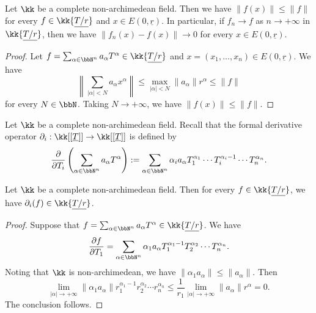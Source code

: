     \begin{lemma}\label{prop:convergence_of_restricted_power_series_imply_convergence_of_functions}
        Let \(\kk\) be a complete non-archimedean field.
        Then we have \(\|f(x)\| \leq \|f\|\) for every \(f \in \kk\{ \underline{T/r} \} \) and \(x \in E(0,\underline{r})\).
        In particular, if \(f_n \to f\) as \(n \to +\infty\) in \(\kk\{ \underline{T/r} \} \), then we have \(\|f_n(x) - f(x)\| \to 0\) for every \(x \in E(0,\underline{r})\).
    \end{lemma}
    \begin{proof}
        Let \(f = \sum_{\alpha \in \bbN^n} a_\alpha T^\alpha \in \kk\{ \underline{T/r} \} \) and \(x = (x_1, \ldots, x_n) \in E(0,\underline{r})\).
        We have
        \[ \left\| \sum_{|\alpha| < N} a_\alpha x^\alpha \right\| \leq \max_{|\alpha| < N} \|a_\alpha\| r^\alpha \leq \|f\| \]
        for every \(N \in \bbN\).
        Taking \(N \to +\infty\), we have \(\|f(x)\| \leq \|f\|\).
    \end{proof}

    Let \(\kk\) be a complete non-archimedean field.
    Recall that the formal derivative operator \(\partial_i: \kk[[\underline{T}]] \to \kk[[\underline{T}]] \) is defined by
    \[
        \frac{\partial}{\partial T_i} \left( \sum_{\alpha \in \bbN^n} a_\alpha T^\alpha \right) := \sum_{\alpha \in \bbN^n} \alpha_i a_\alpha T_1^{\alpha_1} \cdots T_i^{\alpha_i - 1} \cdots T_n^{\alpha_n}.
    \]

    \begin{lemma}\label{prop:formal_derivative_of_restricted_power_series_is_also_a_restricted_power_series}
        Let \(\kk\) be a complete non-archimedean field.
        Then for every \(f \in \kk\{ \underline{T/r} \} \), we have \(\partial_i(f) \in \kk\{ \underline{T/r} \} \).
    \end{lemma}
    \begin{proof}
        Suppose that \(f = \sum_{\alpha \in \bbN^n} a_\alpha T^\alpha \in \kk\{ \underline{T/r} \} \).
        We have
        \[ \frac{\partial f}{\partial T_1} = \sum_{\alpha \in \bbN^n} \alpha_1 a_\alpha T_1^{\alpha_1 - 1} T_2^{\alpha_2} \cdots T_n^{\alpha_n}. \]
        Noting that \(\kk\) is non-archimedean, we have \(\|\alpha_1 a_\alpha\| \leq \|a_\alpha\|\).
        Then 
        \[ \lim_{|\alpha| \to +\infty} \| \alpha_1 a_\alpha \| r_1^{\alpha_1 - 1} r_2^{\alpha_2} \cdots r_n^{\alpha_n} \leq  \frac{1}{r_1} \lim_{|\alpha| \to +\infty} \|a_\alpha\| r^\alpha = 0. \]
        The conclusion follows.
    \end{proof}

